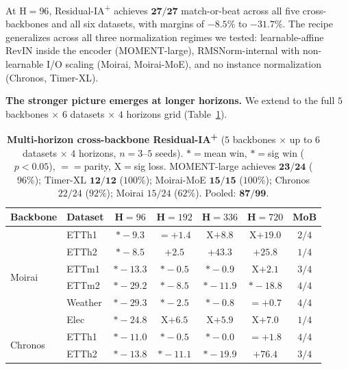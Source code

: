 \documentclass{article}
\begin{document}
At H${=}96$, Residual-IA\textsuperscript{+} achieves $\mathbf{27/27}$ match-or-beat across all five cross-backbones and all six datasets, with margins of $-8.5\%$ to $-31.7\%$. The recipe generalizes across all three normalization regimes we tested: learnable-affine RevIN inside the encoder (MOMENT-large), RMSNorm-internal with non-learnable I/O scaling (Moirai, Moirai-MoE), and no instance normalization (Chronos, Timer-XL).

\textbf{The stronger picture emerges at longer horizons.} We extend to the full $5$ backbones $\times$ $6$ datasets $\times$ $4$ horizons grid (Table~\ref{tab:residual_ia_plus_mhcb}).

\begin{table}[!htbp]
\centering
\caption{\textbf{Multi-horizon cross-backbone Residual-IA\textsuperscript{+}} ($5$ backbones $\times$ up to $6$ datasets $\times$ $4$ horizons, $n{=}3$--$5$ seeds). $*{=}$mean win, $\mathbf{*}{=}$sig win ($p{<}0.05$), $={=}$parity, X${=}$sig loss. MOMENT-large achieves $\mathbf{23/24}$ ($96\%$); Timer-XL $\mathbf{12/12}$ ($100\%$); Moirai-MoE $\mathbf{15/15}$ ($100\%$); Chronos $22/24$ ($92\%$); Moirai $15/24$ ($62\%$). Pooled: $\mathbf{87/99}$.}
\label{tab:residual_ia_plus_mhcb}
\small
\begin{tabular}{@{}ll|cccc|c@{}}
\toprule
Backbone & Dataset & H${=}96$ & H${=}192$ & H${=}336$ & H${=}720$ & MoB \\
\midrule
\multirow{6}{*}{Moirai}   & ETTh1   & $\mathbf{*{-}9.3}$ & $={+}1.4$ & X${+}8.8$ & X${+}19.0$ & $2/4$ \\
                           & ETTh2   & $*{-}8.5$ & ${+}2.5$ & ${+}43.3$ & ${+}25.8$ & $1/4$ \\
                           & ETTm1   & $\mathbf{*{-}13.3}$ & $*{-}0.5$ & $*{-}0.9$ & X${+}2.1$ & $3/4$ \\
                           & ETTm2   & $\mathbf{*{-}29.2}$ & $\mathbf{*{-}8.5}$ & $\mathbf{*{-}11.9}$ & $*{-}18.8$ & $4/4$ \\
                           & Weather & $\mathbf{*{-}29.3}$ & $\mathbf{*{-}2.5}$ & $*{-}0.8$ & $={+}0.7$ & $4/4$ \\
                           & Elec    & $\mathbf{*{-}24.8}$ & X${+}6.5$ & X${+}5.9$ & X${+}7.0$ & $1/4$ \\
\midrule
\multirow{6}{*}{Chronos}  & ETTh1   & $\mathbf{*{-}11.0}$ & $*{-}0.5$ & $*{-}0.0$ & $={+}1.8$ & $4/4$ \\
                           & ETTh2   & $\mathbf{*{-}13.8}$ & $*{-}11.1$ & $\mathbf{*{-}19.9}$ & ${+}76.4$ & $3/4$ \\

\end{tabular}
\end{table}
\end{document}
